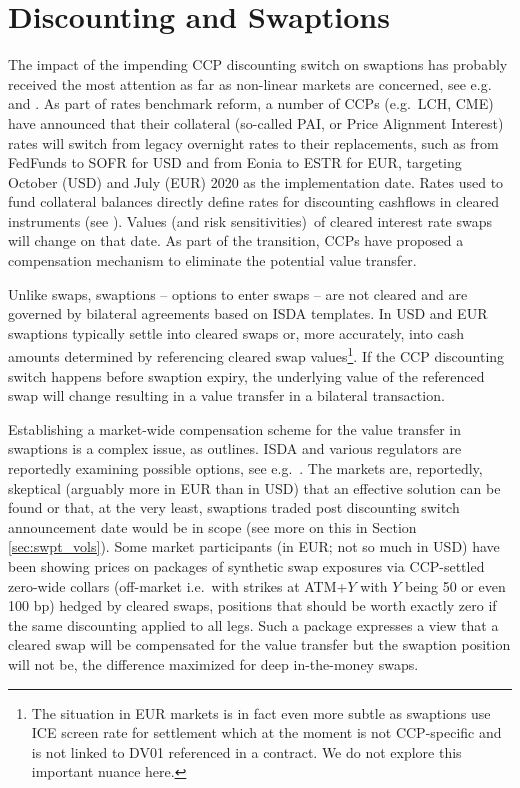 \documentclass{article}
\begin{document}
\section{Discounting and Swaptions}

The impact of the impending CCP discounting switch on swaptions has probably
received the most attention as far as non-linear markets are concerned, see
e.g.~\cite{risk-swpt} and \cite{arrc}. As part of rates benchmark reform, a
number of CCPs (e.g.\ LCH, CME) have announced that their collateral
(so-called PAI, or Price Alignment Interest) rates will switch from legacy
overnight rates to their replacements, such as from FedFunds to SOFR for USD
and from Eonia to ESTR for EUR, targeting October (USD) and July (EUR) 2020
as the implementation date. Rates used to fund collateral balances directly
define rates for discounting cashflows in cleared instruments (see \cite%
{vp-disc}). Values (and risk sensitivities)\ of cleared interest rate swaps
will change on that date. As part of the transition, CCPs have proposed a
compensation mechanism to eliminate the potential value transfer.

Unlike swaps, swaptions -- options to enter swaps -- are not cleared and are
governed by bilateral agreements based on ISDA templates. In USD and EUR
swaptions typically settle into cleared swaps or, more accurately, into cash
amounts determined by referencing cleared swap values\footnote{%
The situation in EUR markets is in fact even more subtle as swaptions use
ICE screen rate for settlement which at the moment is not CCP-specific and
is not linked to DV01 referenced in a contract. We do not explore this
important nuance here.}. If the CCP discounting switch happens before
swaption expiry, the underlying value of the referenced swap will change
resulting in a value transfer in a bilateral transaction.

Establishing a market-wide compensation scheme for the value transfer in
swaptions is a complex issue, as \cite{risk-swpt} outlines. ISDA and various
regulators are reportedly examining possible options, see e.g.~\cite{arrc}.
The markets are, reportedly, skeptical (arguably more in EUR than in USD)
that an effective solution can be found or that, at the very least,
swaptions traded post discounting switch announcement date would be in scope
(see more on this in Section \ref{sec:swpt_vols}). Some market participants
(in EUR; not so much in USD) have been showing prices on packages of
synthetic swap exposures via CCP-settled zero-wide collars (off-market i.e.\
with strikes at ATM+$Y$ with $Y$ being 50 or even 100 bp) hedged by cleared
swaps, positions that should be worth exactly zero if the same discounting
applied to all legs. Such a package expresses a view that a cleared swap
will be compensated for the value transfer but the swaption position will
not be, the difference maximized for deep in-the-money swaps.
\end{document}
